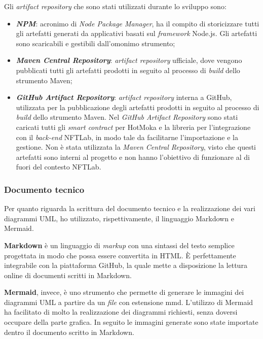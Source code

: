 \noindent Gli \textit{artifact repository} che sono stati utilizzati durante lo sviluppo sono:
\begin{itemize}
  \item \textbf{\textit{NPM}}: acronimo di \textit{Node Package Manager}, ha il compito di storicizzare tutti gli artefatti generati da applicativi basati sul \textit{framework} Node.js. Gli artefatti sono scaricabili e gestibili dall'omonimo strumento;
  \item \textbf{\textit{Maven Central Repository}}: \textit{artifact repository} ufficiale, dove vengono pubblicati tutti gli artefatti prodotti in seguito al processo di \textit{build} dello strumento Maven;
  \item \textbf{\textit{GitHub Artifact Repository}}: \textit{artifact repository} interna a GitHub, utilizzata per la pubblicazione degli artefatti prodotti in seguito al processo di \textit{build} dello strumento Maven. Nel \textit{GitHub Artifact Repository} sono stati caricati tutti gli \textit{smart contract} per HotMoka e la libreria per l'integrazione con il \textit{back-end} NFTLab, in modo tale da facilitarne l'importazione e la gestione. Non è stata utilizzata la \textit{Maven Central Repository}, visto che questi artefatti sono interni al progetto e non hanno l'obiettivo di funzionare al di fuori del contesto NFTLab.
\end{itemize}

\subsubsection{Documento tecnico}
Per quanto riguarda la scrittura del documento tecnico e la realizzazione dei vari diagrammi UML, ho utilizzato, rispettivamente, il linguaggio Markdown e Mermaid. 

\textbf{Markdown} è un linguaggio di \textit{markup} con una sintassi del testo semplice progettata in modo che possa essere convertita in HTML. È perfettamente integrabile con la piattaforma GitHub, la quale mette a disposizione la lettura online di documenti scritti in Markdown.

\textbf{Mermaid}, invece, è uno strumento che permette di generare le immagini dei diagrammi UML a partire da un \textit{file} con estensione mmd. L'utilizzo di Mermaid ha facilitato di molto la realizzazione dei diagrammi richiesti, senza doversi occupare della parte grafica. In seguito le immagini generate sono state importate dentro il documento scritto in Markdown.


